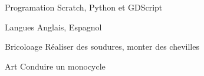 

\begin{cvskills}

  \cvskill
    {Programation} %
    {Scratch, Python et GDScript} %

  \cvskill
    {Langues} %
    {Anglais, Espagnol} %

\cvskill
    {Bricoloage} %
    {Réaliser des soudures, monter des chevilles} %

\cvskill
    {Art} %
    {Conduire un monocycle} %
\end{cvskills}
